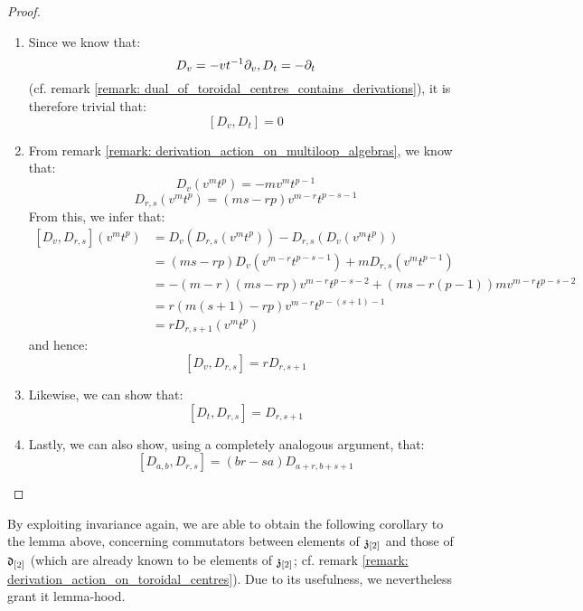             \begin{proof}
                \begin{enumerate}
                    \item Since we know that:
                        $$D_v = -vt^{-1} \partial_v, D_t = -\partial_t$$
                    (cf. remark \ref{remark: dual_of_toroidal_centres_contains_derivations}), it is therefore trivial that:
                        $$[D_v, D_t] = 0$$
                    \item From remark \ref{remark: derivation_action_on_multiloop_algebras}, we know that:
                        $$D_v(v^m t^p) = -m v^m t^{p - 1}$$
                        $$D_{r, s}(v^m t^p) = ( ms - rp ) v^{m - r} t^{p - s - 1}$$
                    From this, we infer that:
                        $$
                            \begin{aligned}
                                [D_v, D_{r, s}](v^m t^p) & = D_v( D_{r, s}(v^m t^p) ) - D_{r, s}( D_v(v^m t^p) )
                                \\
                                & = (ms - rp) D_v( v^{m - r} t^{p - s - 1} ) + m D_{r, s}( v^m t^{p - 1} )
                                \\
                                & = -(m - r)(ms - rp) v^{m - r} t^{p - s - 2} + (ms - r(p - 1)) m v^{m - r} t^{p - s - 2}
                                \\
                                & = r(m(s + 1) - rp) v^{m - r} t^{p - (s + 1) - 1}
                                \\
                                & = r D_{r, s + 1}(v^m t^p)
                            \end{aligned}
                        $$
                    and hence:
                        $$[D_v, D_{r, s}] = r D_{r, s + 1}$$
                    \item Likewise, we can show that:
                        $$[D_t, D_{r, s}] = D_{r, s + 1}$$
                    \item Lastly, we can also show, using a completely analogous argument, that:
                        $$[D_{a, b}, D_{r, s}] = (br - sa) D_{a + r, b + s + 1}$$
                \end{enumerate}
            \end{proof}
        By exploiting invariance again, we are able to obtain the following corollary to the lemma above, concerning commutators between elements of $\mathfrak{z}_{[2]}$ and those of $\mathfrak{d}_{[2]}$ (which are already known to be elements of $\mathfrak{z}_{[2]}$; cf. remark \ref{remark: derivation_action_on_toroidal_centres}). Due to its usefulness, we nevertheless grant it lemma-hood.
